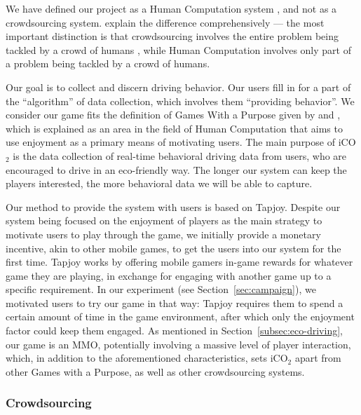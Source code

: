 \documentclass[preprint,authoryear,12pt]{elsarticle}
\begin{document}
We have defined our project as a Human Computation system \citep{Yuen.2009,Krause+Smeddinck.2011}, and not as a crowdsourcing system. \cite{Quinn} explain the difference comprehensively --- the most important distinction is that crowdsourcing involves the entire problem being tackled by a crowd of humans \citep{howe2008crowdsourcing}, while Human Computation involves only part of a problem being tackled by a crowd of humans.

Our goal is to collect and discern driving behavior. Our users fill in for a part of the ``algorithm'' of data collection, which involves them ``providing behavior''. 
We consider our game fits the definition of Games With a Purpose given by \cite{Quinn} and \cite{vonAhn2006Games}, which is explained as an area in the field of Human Computation that aims to use enjoyment as a primary means of motivating users. The main purpose of iCO$_2$ is the data collection of real-time behavioral driving data from users, who are encouraged to drive in an eco-friendly way. The longer our system can keep the players interested, the more behavioral data we will be able to capture. 



Our method to provide the system with users is based on Tapjoy. Despite our system being focused on the enjoyment of players as the main strategy to motivate users to play through the game, we initially provide a monetary incentive, akin to other mobile games, to get the users into our system for the first time. Tapjoy works by offering mobile gamers in-game rewards for whatever game they are playing, in exchange for engaging with another game up to a specific requirement. In our experiment (see Section~\ref{sec:campaign}), we motivated users to try our game in that way: Tapjoy requires them to spend a certain amount of time in the game environment, after which only the enjoyment factor could keep them engaged.
As mentioned in Section~\ref{subsec:eco-driving}, our game is an MMO, potentially involving a massive level of player interaction, which, in addition to the aforementioned characteristics, sets iCO$_2$ apart from other Games with a Purpose, as well as other crowdsourcing systems.


\subsubsection{Crowdsourcing}
\end{document}
